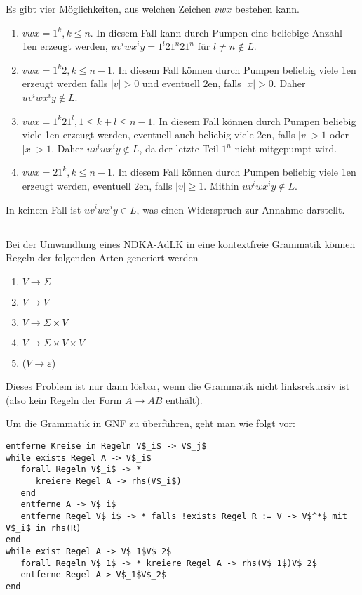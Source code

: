 \documentclass{article}
\begin{document}
Es gibt vier Möglichkeiten, aus welchen Zeichen $vwx$ bestehen kann.
\begin{enumerate}
   \item $vwx = 1^k, k\le n$. In diesem Fall kann durch Pumpen eine beliebige
      Anzahl 1en erzeugt werden, $uv^iwx^iy = 1^l21^n21^n \text{ für } l \neq n\not\in L$.
   \item $vwx = 1^k2, k\le n-1$. In diesem Fall können durch Pumpen beliebig
   viele 1en erzeugt werden falls $|v| > 0$ und eventuell 2en, falls $|x|>0$. Daher
      $uv^iwx^iy \not\in L$.
   \item $vwx = 1^k21^l, 1\le k+l\le n-1$. In diesem Fall können durch Pumpen beliebig
      viele 1en erzeugt werden, eventuell auch beliebig viele 2en, falls $|v|>1$
      oder $|x|>1$. Daher $uv^iwx^iy \not\in L$, da der letzte Teil $1^n$ nicht
      mitgepumpt wird.
   \item $vwx = 21^k, k\le n-1$. In diesem Fall können durch Pumpen beliebig
      viele 1en erzeugt werden, eventuell 2en, falls $|v|\ge 1$. Mithin
      $uv^iwx^iy \not\in L$.
\end{enumerate}

In keinem Fall ist $uv^iwx^iy \in L$, was einen Widerspruch zur Annahme
darstellt.

\subsection{} 

Bei der Umwandlung eines NDKA-AdLK in eine kontextfreie Grammatik können Regeln der folgenden Arten generiert werden
\begin{enumerate}
	\item $V \rightarrow \Sigma$
  \item $V \rightarrow V$
  \item $V \rightarrow \Sigma \times V$
  \item $V \rightarrow \Sigma \times V \times V$
  \item ($V \rightarrow \varepsilon$)
\end{enumerate}

Dieses Problem ist nur dann lösbar, wenn die Grammatik nicht linksrekursiv ist
(also kein Regeln der Form $A\rightarrow AB$ enthält).

Um die Grammatik in GNF zu überführen, geht man wie folgt vor:
\begin{lstlisting}[mathescape]
entferne Kreise in Regeln V$_i$ -> V$_j$
while exists Regel A -> V$_i$
   forall Regeln V$_i$ -> * 
      kreiere Regel A -> rhs(V$_i$)
   end
   entferne A -> V$_i$
   entferne Regel V$_i$ -> * falls !exists Regel R := V -> V$^*$ mit V$_i$ in rhs(R)
end
while exist Regel A -> V$_1$V$_2$
   forall Regeln V$_1$ -> * kreiere Regel A -> rhs(V$_1$)V$_2$
   entferne Regel A-> V$_1$V$_2$
end
\end{lstlisting}
\end{document}
